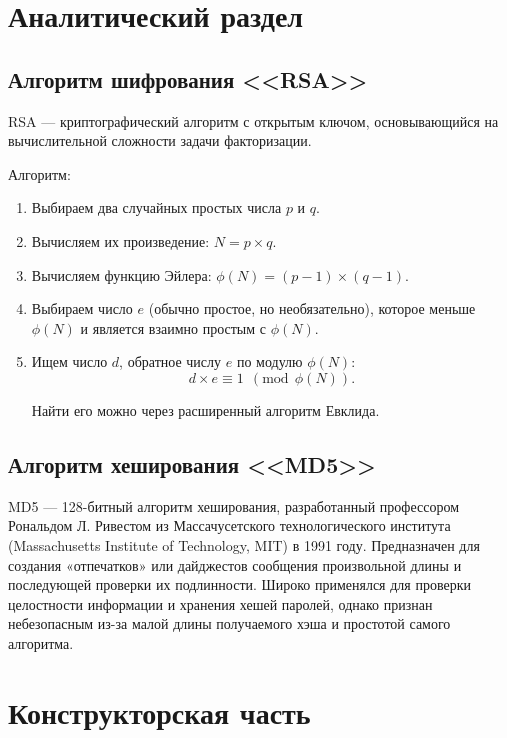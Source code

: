 \chapter{Аналитический раздел}

\section{Алгоритм шифрования <<RSA>>}

RSA --- криптографический алгоритм с открытым ключом, основывающийся на вычислительной сложности задачи факторизации.

Алгоритм:

\begin{enumerate}
	\item Выбираем два случайных простых числа $p$ и $q$.
	\item Вычисляем их произведение: $N = p \times q$.
	\item Вычисляем функцию Эйлера: $\phi(N) = (p - 1) \times (q - 1)$.
	\item Выбираем число $e$ (обычно простое, но необязательно), которое меньше $\phi(N)$ и является взаимно простым с $\phi(N)$.
	\item Ищем число $d$, обратное числу $e$ по модулю $\phi(N)$:
	\begin{equation*}
		d \times e \equiv 1 ~~ (\textrm{mod} ~~ \phi(N)).
	\end{equation*}

	Найти его можно через расширенный алгоритм Евклида.
\end{enumerate}

\section{Алгоритм хеширования <<MD5>>}

MD5 --- 128-битный алгоритм хеширования, разработанный профессором Рональдом Л. Ривестом из Массачусетского технологического института (Massachusetts Institute of Technology, MIT) в 1991 году.
Предназначен для создания «отпечатков» или дайджестов сообщения произвольной длины и последующей проверки их подлинности.
Широко применялся для проверки целостности информации и хранения хешей паролей, однако признан небезопасным из-за малой длины получаемого хэша и простотой самого алгоритма.

\chapter{Конструкторская часть}

